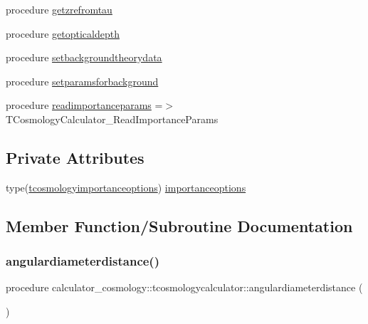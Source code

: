 \begin{DoxyCompactItemize}
\item 
procedure \mbox{\hyperlink{structcalculator__cosmology_1_1tcosmologycalculator_a8e4aa5498ad5ca1277d5dceeedf88927}{getzrefromtau}}
\item 
procedure \mbox{\hyperlink{structcalculator__cosmology_1_1tcosmologycalculator_a7614fbcfb4e01fe0a5443c67bb55b912}{getopticaldepth}}
\item 
procedure \mbox{\hyperlink{structcalculator__cosmology_1_1tcosmologycalculator_a2e9d994537d05dc376d30c7c80bdad30}{setbackgroundtheorydata}}
\item 
procedure \mbox{\hyperlink{structcalculator__cosmology_1_1tcosmologycalculator_adbee1a9cd85334564f4b07a38b85d61e}{setparamsforbackground}}
\item 
procedure \mbox{\hyperlink{structcalculator__cosmology_1_1tcosmologycalculator_ab721c70d1a81554fd7c97d70e588b46e}{readimportanceparams}} =$>$ T\+Cosmology\+Calculator\+\_\+\+Read\+Importance\+Params
\end{DoxyCompactItemize}
\subsection*{Private Attributes}
\begin{DoxyCompactItemize}
\item 
type(\mbox{\hyperlink{structcalculator__cosmology_1_1tcosmologyimportanceoptions}{tcosmologyimportanceoptions}}) \mbox{\hyperlink{structcalculator__cosmology_1_1tcosmologycalculator_a7e34162850a01e3e3dbfd5043e689553}{importanceoptions}}
\end{DoxyCompactItemize}


\subsection{Member Function/\+Subroutine Documentation}
\mbox{\label{structcalculator__cosmology_1_1tcosmologycalculator_a534991fa7fb6aff23cd5ed4d6c2f8fb3}} 
\subsubsection{\texorpdfstring{angulardiameterdistance()}{angulardiameterdistance()}}
{\footnotesize\ttfamily procedure calculator\+\_\+cosmology\+::tcosmologycalculator\+::angulardiameterdistance (\begin{DoxyParamCaption}{ }\end{DoxyParamCaption})\hspace{0.3cm}{\ttfamily [private]}}

